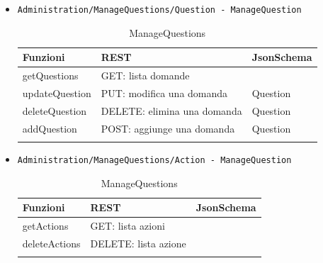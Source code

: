 \documentclass[../DefinizioneDiProdotto_v3.0.0.tex]{subfiles}
\begin{document}
\begin{itemize}
	\item \texttt{Administration/ManageQuestions/Question - ManageQuestion}
	      \begin{longtable}[c] { >{\centering\arraybackslash}p{3cm} >{\centering\arraybackslash}p{6cm} >{\centering\arraybackslash}p{3cm}}
	      	\toprule
	      	\centerline{\textbf{Funzioni}} & \centerline{\textbf{REST}}  & \centerline{\textbf{JsonSchema}} \\
	      	\midrule
	      	getQuestions                   & GET: lista domande          &                                  \\
	      	\addlinespace[0.3em]
	      	\midrule
	      	\addlinespace[0.3em]
	      	updateQuestion                 & PUT: modifica una domanda   & Question                         \\
	      	\addlinespace[0.3em]
	      	\midrule
	      	\addlinespace[0.3em]
	      	deleteQuestion                 & DELETE: elimina una domanda & Question                         \\
	      	\addlinespace[0.3em]
	      	\midrule
	      	\addlinespace[0.3em]
	      	addQuestion                    & POST: aggiunge una domanda  & Question                         \\

	      	\bottomrule
	      	\caption{ManageQuestions}
	      \end{longtable}

	\item \texttt{Administration/ManageQuestions/Action - ManageQuestion}
	      \begin{longtable}[c] { >{\centering\arraybackslash}p{3cm} >{\centering\arraybackslash}p{6cm} >{\centering\arraybackslash}p{3cm}}
	      	\toprule
	      	\centerline{\textbf{Funzioni}} & \centerline{\textbf{REST}} & \centerline{\textbf{JsonSchema}} \\
	      	\midrule
	      	getActions                     & GET: lista azioni          &                                  \\
			\midrule
	      	deleteActions                  & DELETE: lista azione       &                                  \\
	      	\bottomrule
	      	\caption{ManageQuestions}
	      \end{longtable}


\end{itemize}
\end{document}
